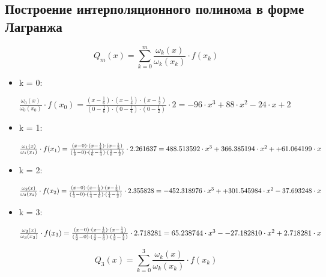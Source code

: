\subsection{Построение интерполяционного полинома в форме Лагранжа}

\begin{displaymath}
Q_m(x) = \sum_{k=0}^m \frac{\omega_k(x)}{\omega_k(x_k)} \cdot f(x_k)
\end{displaymath}

\begin{itemize}

\item k = 0:

$\frac{\omega_0(x)}{\omega_0(x_0)} \cdot f(x_0) = \frac{(x - \frac{1}{6}) \cdot (x - \frac{1}{4}) \cdot (x - \frac{1}{2})}{(0 - \frac{1}{6}) \cdot (0 - \frac{1}{4}) \cdot (0 - \frac{1}{2})} \cdot 2 = - 96 \cdot x^3 + 88 \cdot x^2 - 24 \cdot x + 2$

\item k = 1:

$\frac{\omega_1(x)}{\omega_1(x_1)} \cdot f(x_1) = \frac{(x - 0) \cdot (x - \frac{1}{4}) \cdot (x - \frac{1}{2})}{(\frac{1}{6} - 0) \cdot (\frac{1}{6} - \frac{1}{4}) \cdot (\frac{1}{6} - \frac{1}{2})} \cdot 2.261637 = 488.513592 \cdot x^3 + 366.385194 \cdot x^2 + \\[1mm] + 61.064199 \cdot x$

\item k = 2:

$\frac{\omega_2(x)}{\omega_2(x_2)} \cdot f(x_2) = \frac{(x - 0) \cdot (x - \frac{1}{6}) \cdot (x - \frac{1}{2})}{(\frac{1}{4} - 0) \cdot (\frac{1}{4} - \frac{1}{6}) \cdot (\frac{1}{4} - \frac{1}{2})} \cdot 2.355828 = -452.318976 \cdot x^3 + \\[1mm] + 301.545984 \cdot x^2 - 37.693248 \cdot x$

\item k = 3:

$\frac{\omega_3(x)}{\omega_3(x_3)} \cdot f(x_3) = \frac{(x - 0) \cdot (x - \frac{1}{6}) \cdot (x - \frac{1}{4})}{(\frac{1}{2} - 0) \cdot (\frac{1}{2} - \frac{1}{6}) \cdot (\frac{1}{2} - \frac{1}{4})} \cdot 2.718281 = 65.238744 \cdot x^3 - \\[1mm] - 27.182810 \cdot x^2 + 2.718281 \cdot x$

\end{itemize}

\begin{displaymath}
Q_3(x) = \sum_{k=0}^3 \frac{\omega_k(x)}{\omega_k(x_k)} \cdot f(x_k)
\end{displaymath}

